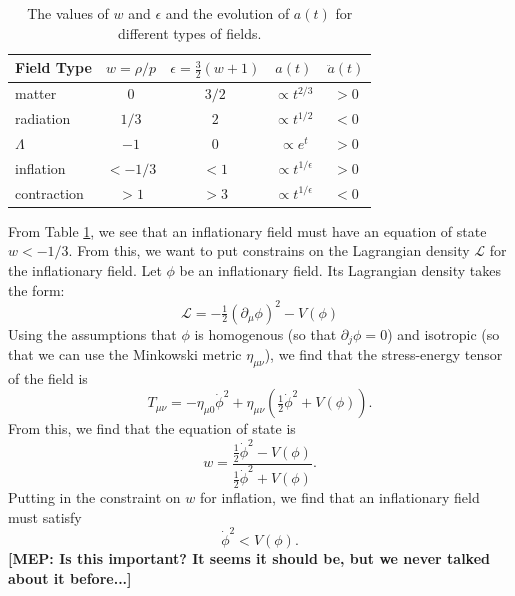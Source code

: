 \documentclass[a4paper,11pt]{article}
\def\L{\mathscr{L}}
\def\half{\tfrac{1}{2}}
\newcommand{\mep}[1]{{\color{applegreen} \textbf{[MEP:  #1]}}}
\begin{document}
\begin{table}[htbp]
   \centering
   \begin{tabular}{@{} lcccc @{}} %
      \toprule
      Field Type & $w=\rho/p$ &  $\epsilon=\tfrac{3}{2}(w+1)$ & $a(t)$ & $\ddot a(t)$ \\
      \midrule
      matter & 0 & $3/2$ & $\propto t^{2/3}$ & $>0$ \\
       radiation & $1/3$ & $2$ & $\propto t^{1/2}$ & $<0$ \\
       $\Lambda$ & $-1$ & $0$ & $\propto e^t$ & $>0$ \\
       inflation & $<-1/3$ & $<1$ & $\propto t^{1/\epsilon}$ & $>0$ \\
       contraction & $>1$ & $>3$ & $\propto t^{1/\epsilon}$ & $<0$ \\
      \bottomrule
   \end{tabular}
   \caption{The values of $w$ and $\epsilon$ and the evolution of $a(t)$ for different types of fields.}
   \label{tab:field_scenarios}
\end{table}


From Table \ref{tab:field_scenarios}, we see that an inflationary field must have an equation of state $w<-1/3$. From this, we want to put constrains on the Lagrangian density $\L$ for the inflationary field. Let $\phi$ be an inflationary field. Its Lagrangian density takes the form:
\begin{equation}
\L = -\half ( \partial_\mu \phi)^2 - V(\phi)
\end{equation}
Using the assumptions that $\phi$ is homogenous (so that $\partial_j \phi = 0$) and isotropic (so that we can use the Minkowski metric $\eta_{\mu\nu}$), we find that the stress-energy tensor of the field is
\begin{equation}
T_{\mu\nu} = -\eta_{\mu 0} \dot \phi^2 + \eta_{\mu\nu}(\half\dot \phi^2+V(\phi)).
\end{equation}
From this, we find that the equation of state is
\begin{equation}
w = \frac{\half \dot \phi^2 - V(\phi)}{\half \dot \phi^2 + V(\phi)}.
\label{eqn:w}
\end{equation}
Putting in the constraint on $w$ for inflation, we find that an inflationary field must satisfy 
\begin{equation}
\dot \phi^2 < V(\phi).
\end{equation}
\mep{Is this important? It seems it should be, but we never talked about it before...}
\end{document}
